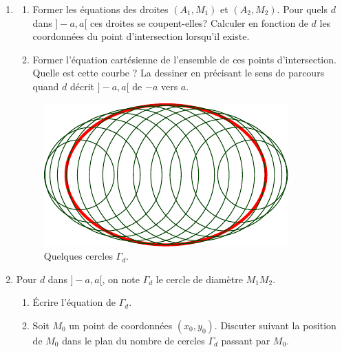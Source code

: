 \begin{enumerate}
\item \begin{enumerate}
   \item Former les équations des droites $(A_1,M_1)$ et $(A_2,M_2)$.\newline
 Pour quels $d$ dans $]-a,a[$ ces droites se coupent-elles? Calculer en fonction de $d$ les coordonnées du point d'intersection lorsqu'il existe. 
   \item Former l'équation cartésienne de l'ensemble de ces points d'intersection. Quelle est cette courbe ? La dessiner en précisant le sens de parcours quand $d$ décrit $]-a,a[$ de $-a$ vers $a$.
      \end{enumerate}

\begin{figure}[h!t]
   \centering
   \includegraphics{Eellipse1_2.pdf}
   \caption{Quelques cercles $\Gamma_d$.}
   \label{fig:Ellipse1_2}
\end{figure}
\item Pour $d$ dans $]-a,a[$, on note $\Gamma_d$ le cercle de diamètre $M_1M_2$.
 \begin{enumerate}
\item {\'E}crire l'équation de $\Gamma_d$.
\item Soit $M_0$ un point de coordonnées $(x_0,y_0)$. Discuter suivant la position de $M_0$ dans le plan du nombre de cercles $\Gamma_d$ passant par  $M_0$.
\end{enumerate}


\end{enumerate}
